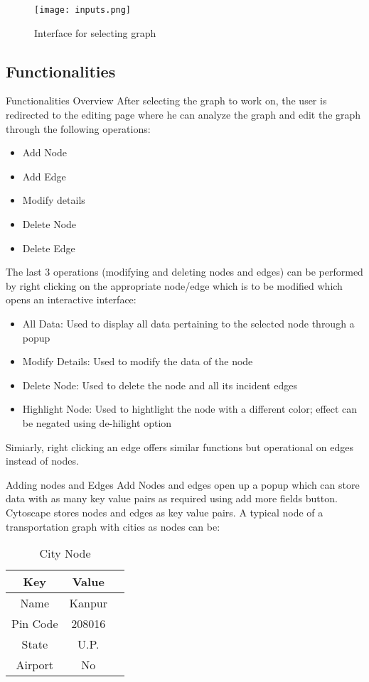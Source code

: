 \documentclass{beamer}
\begin{document}
\begin{frame}
\begin{figure}
\centering
\texttt{[image: inputs.png]}
\label{fig:inputs}
\caption{Interface for selecting graph}
\end{figure}
\end{frame}

\subsection{Functionalities}
\begin{frame}[allowframebreaks]{Functionalities Overview}
After selecting the graph to work on, the user is redirected to the editing page where he can analyze the graph and edit the graph through the following operations:
\begin{itemize}
\item Add Node
\item Add Edge
\item Modify details
\item Delete Node
\item Delete Edge
\end{itemize}
\framebreak
The last 3 operations (modifying and deleting nodes and edges) can be performed by right clicking on the appropriate node/edge which is to be modified which opens an interactive interface:
\begin{itemize} 
\item All Data: Used to display all data pertaining to the selected node through a popup
\item Modify Details: Used to modify the data of the node
\item Delete Node: Used to delete the node and all its incident edges
\item Highlight Node: Used to hightlight the node with a different color; effect can be negated using de-hilight option
\end{itemize}
Simiarly, right clicking an edge offers similar functions but operational on edges instead of nodes.
\end{frame}

\begin{frame}{Adding nodes and Edges}
Add Nodes and edges open up a popup which can store data with as many key value pairs as required using add more fields button. 
Cytoscape stores nodes and edges as key value pairs. A typical node of a transportation graph with cities as nodes can be:
\begin{table}[h!]
\caption{City Node} 
\centering
\begin{tabular}{c c c}
\hline\hline 
Key & Value \\ [0.5ex] 

\hline 
Name & Kanpur \\ 
Pin Code & 208016  \\
State & U.P.  \\
Airport & No  \\
\hline
\end{tabular}
\label{table:node}
\end{table}
\end{frame}
\end{document}
